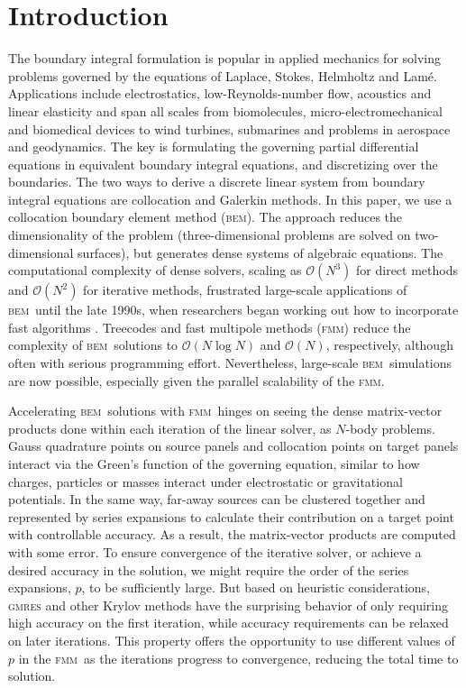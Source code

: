 \documentclass[smallcondensed,final]{svjour3}
\newcommand{\bem}{\textsc{bem}\xspace}
\newcommand{\fmm}{\textsc{fmm}\xspace}
\renewcommand{\O}[1]{\mathcal{O}(#1)}
\newcommand{\gmres}{\textsc{gmres}\xspace}
\begin{document}
\section{Introduction}

The boundary integral formulation is popular in applied mechanics for solving problems governed by the equations of Laplace, Stokes, Helmholtz and Lam{\'e}. Applications include electrostatics, low-Reynolds-number flow, acoustics and linear elasticity and span all scales from biomolecules, micro-electromechanical and biomedical devices to wind turbines, submarines and  problems in aerospace and geodynamics. The key is formulating the governing partial differential equations in equivalent boundary integral equations, and discretizing over the boundaries. 
The two ways to derive a discrete linear system from boundary integral equations are collocation and Galerkin methods.
In this paper, we use a collocation boundary element method (\bem).
The approach reduces the dimensionality of the problem (three-dimensional problems are solved on two-dimensional surfaces), but generates dense systems of algebraic equations. 
The computational complexity of dense solvers, scaling as $\O{N^3}$ for direct methods and $\O{N^2}$ for iterative methods, frustrated large-scale applications of \bem\ until the late 1990s, when researchers began working out how to incorporate fast algorithms 
\cite{Nishimura2002,Liu2006}. Treecodes and fast multipole methods (\fmm) reduce the complexity of \bem\ solutions to $\O{N \log N}$ and $\O{N}$, respectively, although often with serious programming effort. Nevertheless, large-scale \bem\ simulations are now possible, especially given the parallel scalability of the \fmm \cite{YokotaETal2011a,YokotaBarba2011a}.

Accelerating \bem\ solutions with \fmm\ hinges on seeing the dense matrix-vector products done within each iteration of the linear solver, as $N$-body problems. Gauss quadrature points on source panels and collocation points on target panels interact via the Green's function of the governing equation, similar to how charges, particles or masses interact under electrostatic or gravitational potentials. In the same way, far-away sources can be clustered together and represented by series expansions to calculate their contribution on a target point with controllable accuracy. As a result, the matrix-vector products are computed with some error. To ensure convergence of the iterative solver, or achieve a desired accuracy in the solution, we might require the order of the series expansions, $p$, to be sufficiently large. But based on heuristic considerations, \gmres and other Krylov methods have the surprising behavior of only requiring high accuracy on the first iteration, while accuracy requirements can be relaxed on later iterations. This property offers the opportunity to use different values of $p$ in the \fmm\ as the iterations progress to convergence, reducing the total time to solution.
\end{document}
